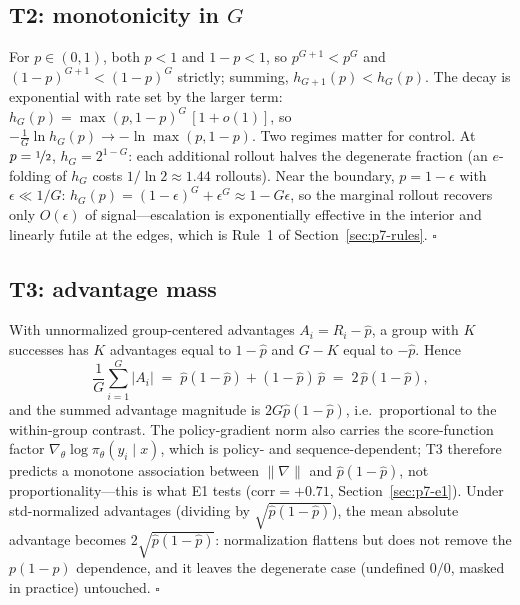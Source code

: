 \documentclass{article}
\providecommand{\eps}{\ensuremath{\epsilon}}
\begin{document}
\subsection{T2: monotonicity in $G$}
\label{sec:p7-appendix-t2}
For $p \in (0,1)$, both $p < 1$ and $1-p < 1$, so $p^{G+1} < p^G$ and
$(1-p)^{G+1} < (1-p)^G$ strictly; summing,
$h_{G+1}(p) < h_G(p)$. The decay is exponential with rate set by the larger
term: $h_G(p) = \max(p, 1-p)^G\,[1 + o(1)]$, so
$-\frac{1}{G}\ln h_G(p) \to -\ln \max(p, 1-p)$. Two regimes matter for
control. At $p = \nicefrac12$, $h_G = 2^{1-G}$: each additional rollout
halves the degenerate fraction (an $e$-folding of $h_G$ costs
$1/\ln 2 \approx 1.44$ rollouts). Near the boundary, $p = 1 - \eps$ with
$\eps \ll 1/G$: $h_G(p) = (1-\eps)^G + \eps^G \approx 1 - G\eps$, so the
marginal rollout recovers only $O(\eps)$ of signal---escalation is
exponentially effective in the interior and linearly futile at the edges,
which is Rule~1 of Section~\ref{sec:p7-rules}. \hfill$\square$

\subsection{T3: advantage mass}
\label{sec:p7-appendix-t3}
With unnormalized group-centered advantages $A_i = R_i - \hat p$, a group
with $K$ successes has $K$ advantages equal to $1 - \hat p$ and $G - K$
equal to $-\hat p$. Hence
\begin{equation}
  \frac{1}{G} \sum_{i=1}^{G} |A_i|
  \;=\; \hat p (1 - \hat p) + (1 - \hat p)\, \hat p
  \;=\; 2\, \hat p (1 - \hat p),
\end{equation}
and the summed advantage magnitude is $2 G \hat p(1-\hat p)$, i.e.\
proportional to the within-group contrast. The policy-gradient norm also
carries the score-function factor
$\nabla_\theta \log \pi_\theta(y_i \mid x)$, which is policy- and
sequence-dependent; T3 therefore predicts a monotone association between
$\|\nabla\|$ and $\hat p(1-\hat p)$, not proportionality---this is what E1
tests ($\mathrm{corr} = +0.71$, Section~\ref{sec:p7-e1}). Under
std-normalized advantages (dividing by
$\sqrt{\hat p(1-\hat p)}$), the mean absolute advantage becomes
$2\sqrt{\hat p(1-\hat p)}$: normalization flattens but does not remove the
$p(1-p)$ dependence, and it leaves the degenerate case (undefined $0/0$,
masked in practice) untouched. \hfill$\square$
\end{document}
